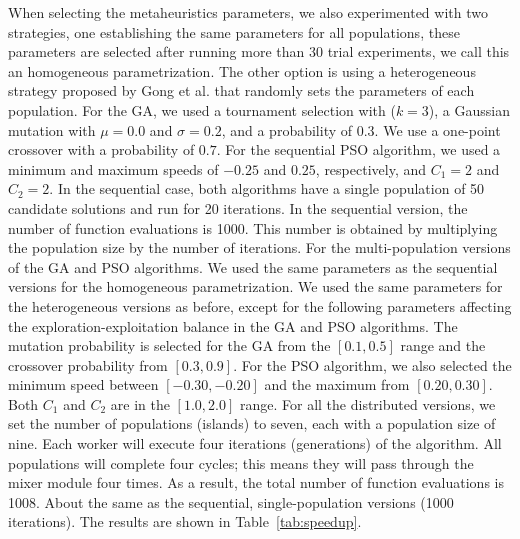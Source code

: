 \documentclass[runningheads]{llncs}
\begin{document}
When selecting the metaheuristics parameters, we also experimented with two
strategies, one establishing the same parameters for all populations, these
parameters are selected after running more than 30 trial experiments, we call
this an homogeneous parametrization. The other option is using a heterogeneous
strategy proposed by Gong et al. \cite{gong2011distributed} that randomly sets
the parameters of each population. For the GA, we used a tournament selection
with ($k=3$), a Gaussian mutation with $\mu = 0.0$ and $\sigma = 0.2$, and a
probability of $0.3$. We use a one-point crossover with a probability of $0.7$.
For the sequential PSO algorithm, we used a minimum and maximum speeds of
$-0.25$ and $0.25$, respectively, and $C_1=2$ and $C_2=2$. In the sequential
case, both algorithms have a single population of 50 candidate solutions and
run for 20 iterations. In the sequential version, the number of function
evaluations is 1000. This number is obtained by multiplying the population size
by the number of iterations. For the multi-population versions of the GA and
PSO algorithms. We used the same parameters as the sequential versions for the
homogeneous parametrization. We used the same parameters for the heterogeneous
versions as before, except for the following parameters affecting the
exploration-exploitation balance in the GA and PSO algorithms. The mutation
probability is selected for the GA from the $[0.1,0.5]$ range and the crossover
probability from $[0.3,0.9]$. For the PSO algorithm, we also selected the
minimum speed between $[-0.30,-0.20]$ and the maximum from $[0.20,0.30]$. Both
$C_1$ and $C_2$ are in the $[1.0,2.0]$ range. For all the distributed versions,
we set the number of populations (islands) to seven, each with a population
size of nine. Each worker will execute four iterations (generations) of the
algorithm. All populations will complete four cycles; this means they will pass
through the mixer module four times. As a result, the total number of function
evaluations is 1008. About %
the same as the sequential, single-population 
versions (1000 iterations). The results are shown in Table~\ref{tab:speedup}.
\end{document}
